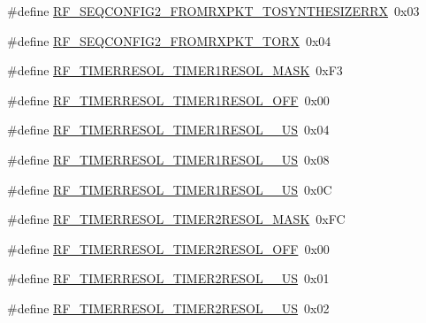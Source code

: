 \begin{DoxyCompactItemize}
\item 
\#define \mbox{\hyperlink{sx1276_regs-_fsk_8h_a23dbeccd9f9305bc5e606ad683a2e26c}{R\+F\+\_\+\+S\+E\+Q\+C\+O\+N\+F\+I\+G2\+\_\+\+F\+R\+O\+M\+R\+X\+P\+K\+T\+\_\+\+T\+O\+S\+Y\+N\+T\+H\+E\+S\+I\+Z\+E\+R\+RX}}~0x03
\item 
\#define \mbox{\hyperlink{sx1276_regs-_fsk_8h_a3d05f39e4ba0e2326381877cde06c05d}{R\+F\+\_\+\+S\+E\+Q\+C\+O\+N\+F\+I\+G2\+\_\+\+F\+R\+O\+M\+R\+X\+P\+K\+T\+\_\+\+T\+O\+RX}}~0x04
\item 
\#define \mbox{\hyperlink{sx1276_regs-_fsk_8h_afefc0f259bc8bcdde6d343b3dc397499}{R\+F\+\_\+\+T\+I\+M\+E\+R\+R\+E\+S\+O\+L\+\_\+\+T\+I\+M\+E\+R1\+R\+E\+S\+O\+L\+\_\+\+M\+A\+SK}}~0x\+F3
\item 
\#define \mbox{\hyperlink{sx1276_regs-_fsk_8h_a06e61a3885ef4ec1cdf878d7f733185d}{R\+F\+\_\+\+T\+I\+M\+E\+R\+R\+E\+S\+O\+L\+\_\+\+T\+I\+M\+E\+R1\+R\+E\+S\+O\+L\+\_\+\+O\+FF}}~0x00
\item 
\#define \mbox{\hyperlink{sx1276_regs-_fsk_8h_a96cf4090d4f2c3bad6d3700db6bd46d5}{R\+F\+\_\+\+T\+I\+M\+E\+R\+R\+E\+S\+O\+L\+\_\+\+T\+I\+M\+E\+R1\+R\+E\+S\+O\+L\+\_\+\_\+\+US}}~0x04
\item 
\#define \mbox{\hyperlink{sx1276_regs-_fsk_8h_a487b01361759b258d03235fcff6d5d51}{R\+F\+\_\+\+T\+I\+M\+E\+R\+R\+E\+S\+O\+L\+\_\+\+T\+I\+M\+E\+R1\+R\+E\+S\+O\+L\+\_\+\_\+\+US}}~0x08
\item 
\#define \mbox{\hyperlink{sx1276_regs-_fsk_8h_ac742a40587f098201b3fb024c6b24020}{R\+F\+\_\+\+T\+I\+M\+E\+R\+R\+E\+S\+O\+L\+\_\+\+T\+I\+M\+E\+R1\+R\+E\+S\+O\+L\+\_\+\_\+\+US}}~0x0C
\item 
\#define \mbox{\hyperlink{sx1276_regs-_fsk_8h_a23a05da24c57dc8c5b1f512637eb7d35}{R\+F\+\_\+\+T\+I\+M\+E\+R\+R\+E\+S\+O\+L\+\_\+\+T\+I\+M\+E\+R2\+R\+E\+S\+O\+L\+\_\+\+M\+A\+SK}}~0x\+FC
\item 
\#define \mbox{\hyperlink{sx1276_regs-_fsk_8h_a1f0fd645faed2c8357ebb3131369c9ba}{R\+F\+\_\+\+T\+I\+M\+E\+R\+R\+E\+S\+O\+L\+\_\+\+T\+I\+M\+E\+R2\+R\+E\+S\+O\+L\+\_\+\+O\+FF}}~0x00
\item 
\#define \mbox{\hyperlink{sx1276_regs-_fsk_8h_aaeb97a29ba9389511206598948f2b544}{R\+F\+\_\+\+T\+I\+M\+E\+R\+R\+E\+S\+O\+L\+\_\+\+T\+I\+M\+E\+R2\+R\+E\+S\+O\+L\+\_\+\_\+\+US}}~0x01
\item 
\#define \mbox{\hyperlink{sx1276_regs-_fsk_8h_a0c4dd1dabb1862f2898d6b2460c59c8d}{R\+F\+\_\+\+T\+I\+M\+E\+R\+R\+E\+S\+O\+L\+\_\+\+T\+I\+M\+E\+R2\+R\+E\+S\+O\+L\+\_\+\_\+\+US}}~0x02
\item 

\end{DoxyCompactItemize}
